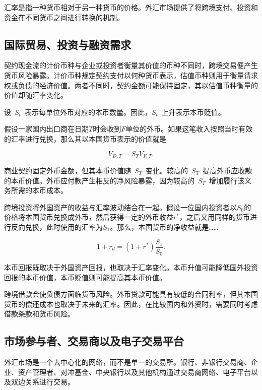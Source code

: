 汇率是指一种货币相对于另一种货币的价格。外汇市场提供了将跨境支付、投资和资金在不同货币之间进行转换的机制。

\subsection{国际贸易、投资与融资需求}

契约现金流的计价币种与企业或投资者衡量其价值的币种不同时，跨境交易便产生货币风险暴露。计价币种规定契约支付以何种货币表示，估值币种则用于衡量请求权或负债的经济价值。两者不同时，契约金额可能保持固定，其以估值币种衡量的价值却随汇率变化。

设~$S_t$~表示每单位外币对应的本币数量。因此，$S_t$~上升表示本币贬值。

假设一家国内出口商在日期$T$时会收到$F$单位的外币。如果这笔收入按照当时有效的汇率进行兑换，那么其以本国货币表示的价值就是

\begin{equation}
V_{D,T}=S_T V_{F,T}.
\label{eq:ch10-export-receivable-value}
\end{equation}

商业契约固定外币金额，但其本币价值随~$S_T$~变化。较高的~$S_T$~提高外币应收款的本币价值。外币应付款产生相反的净风险暴露，因为较高的~$S_T$~增加履行该义务所需的本币成本。

跨境投资将外国资产的收益与汇率波动结合在一起。假设一位国内投资者以$S_0$的价格将本国货币兑换成外币，然后获得一定的外币收益$r^{*}$，之后又用同样的货币进行反向兑换，此时使用的汇率为$S_1$。那么，本国货币的净收益就是……

\begin{equation}
1+r_d=(1+r^{*})\frac{S_1}{S_0}.
\label{eq:ch10-foreign-investment-return}
\end{equation}

本币回报既取决于外国资产回报，也取决于汇率变化。本币升值可能降低国外投资回报的本币价值，本币贬值则可能提高其本币价值。

跨境借款会使负债方面临货币风险。外币贷款可能具有较低的合同利率，但其本国货币的偿还成本也取决于未来的汇率。因此，在比较国内和外资时，需要同时考虑借款条款和货币风险。

\subsection[市场参与者、交易商与电子交易平台]{市场参与者、交易商以及电子交易平台\ }

外汇市场是一个去中心化的网络，而不是单一的交易所。银行、非银行交易商、企业、资产管理者、对冲基金、中央银行以及其他机构通过交易商网络、电子平台以及双边关系进行交易。

